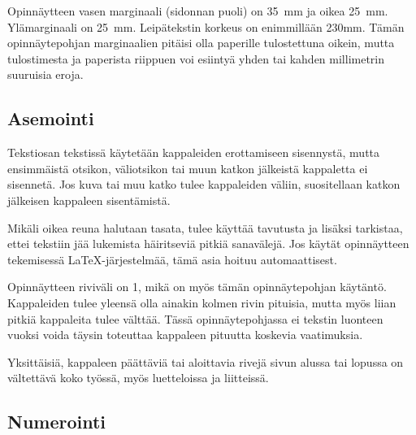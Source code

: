 \documentclass[english,12pt,a4paper,pdftex,elec,utf8]{aaltothesis}
\begin{document}
Opinn\"aytteen vasen marginaali (sidonnan puoli) on
35~mm %
ja oikea 25~mm. Yl\"amarginaali on 25~mm. Leip\"atekstin korkeus on
enimmill\"a\"an 230mm. T\"am\"an opinn\"aytepohjan marginaalien pit\"aisi olla
paperille tulostettuna oikein, mutta tulostimesta ja paperista
riippuen voi esiinty\"a yhden tai kahden millimetrin suuruisia eroja.
\subsection*{Asemointi}

Tekstiosan tekstiss\"a k\"aytet\"a\"an kappaleiden erottamiseen sisennyst\"a,
mutta ensimm\"aist\"a otsikon, v\"aliotsikon tai muun katkon j\"alkeist\"a
kappaletta ei sisennet\"a. Jos kuva tai muu katko tulee kappaleiden
v\"aliin, suositellaan katkon j\"alkeisen kappaleen sisent\"amist\"a.

Mik\"ali oikea reuna halutaan tasata, tulee k\"aytt\"a\"a tavutusta ja lis\"aksi
tarkistaa, ettei tekstiin j\"a\"a lukemista h\"airitsevi\"a pitki\"a sanav\"alej\"a. Jos
k\"ayt\"at opinn\"aytteen tekemisess\"a \LaTeX-j\"arjestelm\"a\"a,
t\"am\"a asia hoituu automaattisest.

Opinn\"aytteen riviv\"ali on 1, mik\"a on my\"os t\"am\"an opinn\"aytepohjan k\"ayt\"ant\"o.
Kappaleiden tulee yleens\"a olla ainakin kolmen rivin pituisia, mutta
my\"os liian pitki\"a kappaleita tulee v\"altt\"a\"a.  T\"ass\"a opinn\"aytepohjassa
ei tekstin luonteen vuoksi voida t\"aysin toteuttaa kappaleen pituutta koskevia
vaatimuksia.

Yksitt\"aisi\"a, kappaleen p\"a\"att\"avi\"a tai aloittavia rivej\"a sivun alussa
tai lopussa on v\"altett\"av\"a koko ty\"oss\"a, my\"os luetteloissa ja
liitteiss\"a.

\subsection*{Numerointi}
\end{document}
